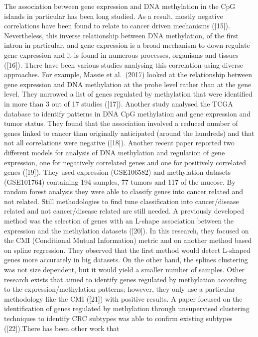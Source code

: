 \documentclass[10pt,letterpaper]{article}
\begin{document}
The association between gene expression and DNA methylation in the CpG
islands in particular has been long studied. As a result, mostly
negative correlations have been found to relate to cancer driven
mechanisms ({[}15{]}). Nevertheless, this inverse relationship between
DNA methylation, of the first intron in particular, and gene expression
is a broad mechanism to down-regulate gene expression and it is found in
numerous processes, organisms and tissues ({[}16{]}). There have been
various studies analysing this correlation using diverse approaches. For
example, Massie et al.~(2017) looked at the relationship between gene
expression and DNA methylation at the probe level rather than at the
gene level. They narrowed a list of genes regulated by methylation that
were identified in more than 3 out of 17 studies ({[}17{]}). Another
study analysed the TCGA database to identify patterns in DNA CpG
methylation and gene expression and tumor status. They found that the
association involved a reduced number of genes linked to cancer than
originally anticipated (around the hundreds) and that not all
correlations were negative ({[}18{]}). Another recent paper reported two
different models for analysis of DNA methylation and regulation of gene
expression, one for negatively correlated genes and one for positively
correlated genes ({[}19{]}). They used expression (GSE106582) and
methylation datasets (GSE101764) containing 194 samples, 77 tumors and
117 of the mucose. By random forest analysis they were able to classify
genes into cancer related and not related. Still methodologies to find
tune classification into cancer/disease related and not cancer/disease
related are still needed. A previously developed method was the
selection of genes with an L-shape association between the expression
and the methylation datasets ({[}20{]}). In this research, they focused
on the CMI (Conditional Mutual Information) metric and on another method
based on spline regression. They observed that the first method would
detect L-shaped genes more accurately in big datasets. On the other
hand, the splines clustering was not size dependent, but it would yield
a smaller number of samples. Other research exists that aimed to
identify genes regulated by methylation according to the
expression/methylation patterns; however, they only use a particular
methodology like the CMI ({[}21{]}) with positive results. A paper
focused on the identification of genes regulated by methylation through
unsupervised clustering techniques to identify CRC subtypes was able to
confirm existing subtypes ({[}22{]}).There has been other work that
\end{document}
